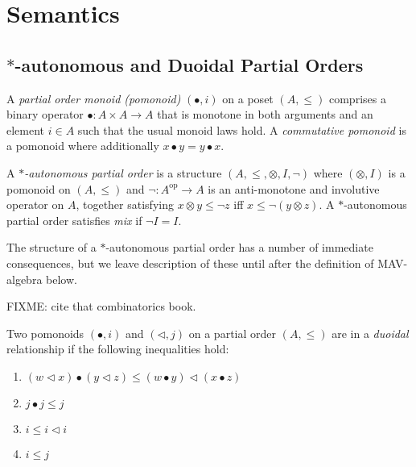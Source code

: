 \section{Semantics}\label{sec:mav-semantics}

\newcommand{\LowerSet}[1]{\widehat{#1}}
\newcommand{\Day}[1]{\mathop{\widehat{#1}}}
\newcommand{\ClosedLowerSet}[1]{\widehat{#1}^+}
\newcommand{\ClosedDay}[1]{\mathop{\widehat{#1}^+}}
\newcommand{\Chu}{\mathrm{Chu}}
\newcommand{\op}{\mathrm{op}}

\subsection{$*$-autonomous and Duoidal Partial Orders}

\begin{definition}
  A \emph{partial order monoid (pomonoid)} $(\bullet, i)$ on a poset
  $(A, \leq)$ comprises a binary operator $\bullet : A \times A \to A$
  that is monotone in both arguments and an element $i \in A$ such
  that the usual monoid laws hold. A \emph{commutative pomonoid} is a
  pomonoid where additionally $x \bullet y = y \bullet x$.
\end{definition}

\begin{definition}
  A \emph{$*$-autonomous partial order} is a structure
  $(A, \leq, \otimes, I, \lnot)$ where $(\otimes, I)$ is a pomonoid on
  $(A, \leq)$ and $\lnot : A^\op \to A$ is an anti-monotone and
  involutive operator on $A$, together satisfying
  $x \otimes y \leq \lnot z$ iff $x \leq \lnot (y \otimes z)$.  A
  $*$-autonomous partial order satisfies \emph{mix} if $\lnot I = I$.
\end{definition}

\begin{remark}
  The structure of a $*$-autonomous partial order has a number of
  immediate consequences, but we leave description of these until
  after the definition of MAV-algebra below. 
\end{remark}

FIXME: cite that combinatorics book.


\begin{definition}
  Two pomonoids $(\bullet, i)$ and $(\lhd, j)$ on a partial order
  $(A, \leq)$ are in a \emph{duoidal} relationship if the following
  inequalities hold:
  \begin{enumerate}
    \item $(w \lhd x) \bullet (y \lhd z) \leq (w \bullet y) \lhd (x \bullet z)$
    \item $j \bullet j \leq j$
    \item $i \leq i \lhd i$
    \item $i \leq j$
  \end{enumerate}
\end{definition}

